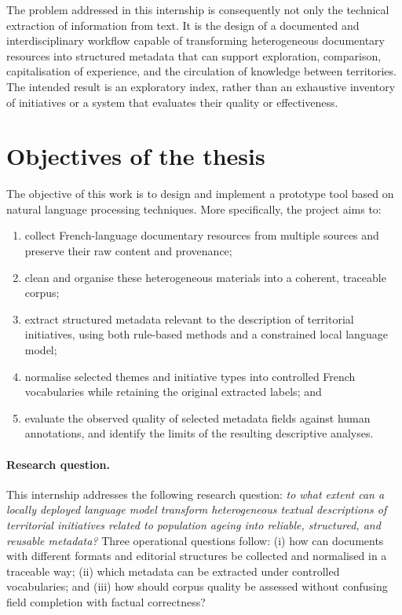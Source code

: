 \documentclass[
11pt,
english,
singlespacing,
headsepline,
]{MastersDoctoralThesis}
\begin{document}
The problem addressed in this internship is consequently not only the technical
extraction of information from text. It is the design of a documented and
interdisciplinary workflow capable of transforming heterogeneous documentary
resources into structured metadata that can support exploration, comparison,
capitalisation of experience, and the circulation of knowledge between territories.
The intended result is an exploratory index, rather than an exhaustive inventory
of initiatives or a system that evaluates their quality or effectiveness.

\section{Objectives of the thesis}

The objective of this work is to design and implement a prototype tool based on
natural language processing techniques. More specifically, the project aims to:

\begin{enumerate}
    \item collect French-language documentary resources from multiple sources and
    preserve their raw content and provenance;
    \item clean and organise these heterogeneous materials into a coherent,
    traceable corpus;
    \item extract structured metadata relevant to the description of territorial
    initiatives, using both rule-based methods and a constrained local language
    model;
    \item normalise selected themes and initiative types into controlled French
    vocabularies while retaining the original extracted labels; and
    \item evaluate the observed quality of selected metadata fields against human
    annotations, and identify the limits of the resulting descriptive analyses.
\end{enumerate}

\paragraph{Research question.}
This internship addresses the following research question: \emph{to what extent
can a locally deployed language model transform heterogeneous textual
descriptions of territorial initiatives related to population ageing into
reliable, structured, and reusable metadata?} Three operational questions
follow: (i) how can documents with different formats and editorial structures be
collected and normalised in a traceable way; (ii) which metadata can be extracted
under controlled vocabularies; and (iii) how should corpus quality be assessed
without confusing field completion with factual correctness?
\end{document}

